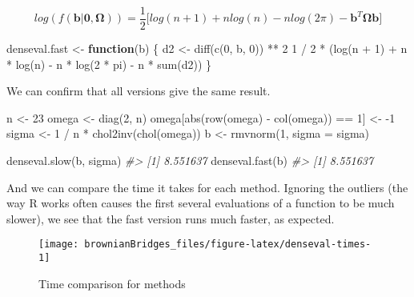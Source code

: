 \documentclass[
]{article}
\newenvironment{Shaded}{\begin{snugshade}}{\end{snugshade}}
\newcommand{\AttributeTok}[1]{\textcolor[rgb]{0.77,0.63,0.00}{#1}}
\newcommand{\CommentTok}[1]{\textcolor[rgb]{0.56,0.35,0.01}{\textit{#1}}}
\newcommand{\ControlFlowTok}[1]{\textcolor[rgb]{0.13,0.29,0.53}{\textbf{#1}}}
\newcommand{\DecValTok}[1]{\textcolor[rgb]{0.00,0.00,0.81}{#1}}
\newcommand{\FunctionTok}[1]{\textcolor[rgb]{0.00,0.00,0.00}{#1}}
\newcommand{\NormalTok}[1]{#1}
\newcommand{\OtherTok}[1]{\textcolor[rgb]{0.56,0.35,0.01}{#1}}
\newcommand{\SpecialCharTok}[1]{\textcolor[rgb]{0.00,0.00,0.00}{#1}}
\begin{document}
\[
  log(f(\mathbf{b}|\mathbf{0}, \mathbf{\Omega})) = \frac{1}{2}\bigg[log(n + 1) + n log(n)- nlog(2\pi) - \mathbf{b}^T\mathbf{\Omega}\mathbf{b}\bigg]
\]

\begin{Shaded}
\begin{Highlighting}[]
\NormalTok{denseval.fast }\OtherTok{\textless{}{-}} \ControlFlowTok{function}\NormalTok{(b) \{}
\NormalTok{  d2 }\OtherTok{\textless{}{-}} \FunctionTok{diff}\NormalTok{(}\FunctionTok{c}\NormalTok{(}\DecValTok{0}\NormalTok{, b, }\DecValTok{0}\NormalTok{)) }\SpecialCharTok{**} \DecValTok{2}
  \DecValTok{1} \SpecialCharTok{/} \DecValTok{2} \SpecialCharTok{*}\NormalTok{ (}\FunctionTok{log}\NormalTok{(n }\SpecialCharTok{+} \DecValTok{1}\NormalTok{) }\SpecialCharTok{+}\NormalTok{ n }\SpecialCharTok{*} \FunctionTok{log}\NormalTok{(n) }\SpecialCharTok{{-}}\NormalTok{ n }\SpecialCharTok{*} \FunctionTok{log}\NormalTok{(}\DecValTok{2} \SpecialCharTok{*}\NormalTok{ pi) }\SpecialCharTok{{-}}\NormalTok{ n }\SpecialCharTok{*} \FunctionTok{sum}\NormalTok{(d2))}
\NormalTok{\}}
\end{Highlighting}
\end{Shaded}

We can confirm that all versions give the same result.

\begin{Shaded}
\begin{Highlighting}[]
\NormalTok{n }\OtherTok{\textless{}{-}} \DecValTok{23}
\NormalTok{omega }\OtherTok{\textless{}{-}} \FunctionTok{diag}\NormalTok{(}\DecValTok{2}\NormalTok{, n)}
\NormalTok{omega[}\FunctionTok{abs}\NormalTok{(}\FunctionTok{row}\NormalTok{(omega) }\SpecialCharTok{{-}} \FunctionTok{col}\NormalTok{(omega)) }\SpecialCharTok{==} \DecValTok{1}\NormalTok{] }\OtherTok{\textless{}{-}} \SpecialCharTok{{-}}\DecValTok{1}
\NormalTok{sigma }\OtherTok{\textless{}{-}} \DecValTok{1} \SpecialCharTok{/}\NormalTok{ n }\SpecialCharTok{*} \FunctionTok{chol2inv}\NormalTok{(}\FunctionTok{chol}\NormalTok{(omega))}
\NormalTok{b }\OtherTok{\textless{}{-}} \FunctionTok{rmvnorm}\NormalTok{(}\DecValTok{1}\NormalTok{, }\AttributeTok{sigma =}\NormalTok{ sigma)}

\FunctionTok{denseval.slow}\NormalTok{(b, sigma)}
\CommentTok{\#\textgreater{} [1] 8.551637}
\FunctionTok{denseval.fast}\NormalTok{(b)}
\CommentTok{\#\textgreater{} [1] 8.551637}
\end{Highlighting}
\end{Shaded}

And we can compare the time it takes for each method. Ignoring the outliers (the way R works often causes the first several evaluations of a function to be much slower), we see that the fast version runs much faster, as expected.

\begin{figure}
\texttt{[image: brownianBridges\_files/figure-latex/denseval-times-1]} \caption{Time comparison for methods}\label{fig:denseval-times}
\end{figure}
\end{document}
